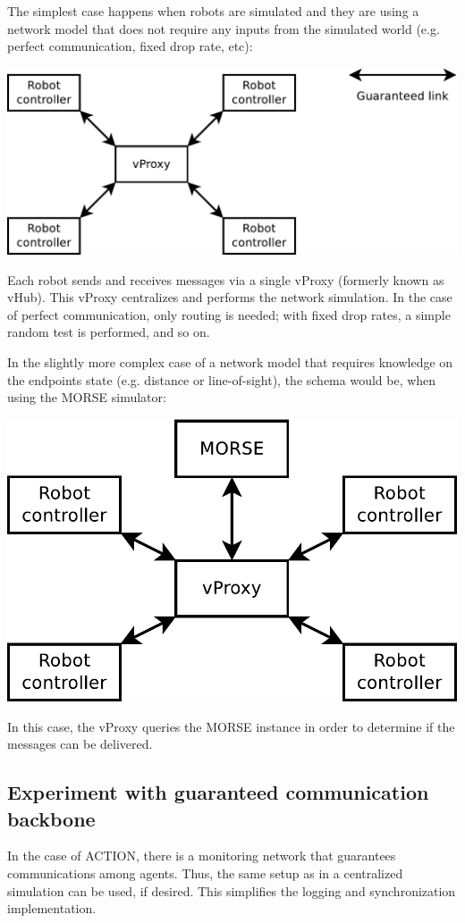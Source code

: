 \documentclass[a4paper,11pt]{article}
\begin{document}
The simplest case happens when robots are simulated and they are using a network model that does not require any inputs from the simulated world (e.g. perfect communication, fixed drop rate, etc):

\begin{center}
\includegraphics[width=0.666\columnwidth]{figures/central}
\end{center}

Each robot sends and receives messages via a single vProxy (formerly known as vHub). This vProxy centralizes and performs the network simulation. In the case of perfect communication, only routing is needed; with fixed drop rates, a simple random test is performed, and so on.

In the slightly more complex case of a network model that requires knowledge on the endpoints state (e.g. distance or line-of-sight), the schema would be, when using the MORSE simulator:

\begin{center}
\includegraphics[width=0.666\columnwidth]{figures/central+morse}
\end{center}

In this case, the vProxy queries the MORSE instance in order to determine if the messages can be delivered.

\subsection{Experiment with guaranteed communication backbone}

In the case of ACTION, there is a monitoring network that guarantees communications among agents. Thus, the same setup as in a centralized simulation can be used, if desired. This simplifies the logging and synchronization implementation.
\end{document}
